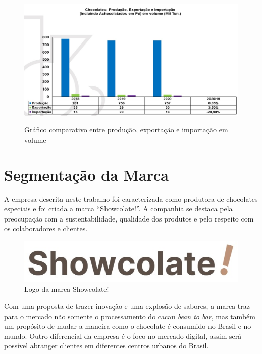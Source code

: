 \documentclass[
	12pt,				%
	openright,			%
	oneside,			%
	a4paper,			%
	english,			%
	french,				%
	spanish,			%
	brazil				%
	]{abntex2}
\begin{document}
\begin{figure}[H]
\begin{center}
\caption{Gráfico comparativo entre produção, exportação e importação em volume}
\includegraphics[scale=0.4]{../../Pictures/fig1.jpeg} 
\label{figmercado2}
\end{center}
\end{figure}

\newpage
\chapter{Segmentação da Marca}

A empresa descrita neste trabalho foi caracterizada como produtora de chocolates especiais e foi criada a marca “Showcolate!”. A companhia se destaca pela preocupação com a sustentabilidade, qualidade dos produtos e pelo respeito com os colaboradores e clientes.

\begin{figure}[H]
\begin{center}
\caption{Logo da marca Showcolate!}
\includegraphics[scale=0.5]{logoShow.jpeg} 
\end{center}
\end{figure}

Com uma proposta de trazer inovação e uma explosão de sabores, a marca traz para o mercado não somente o processamento do cacau \textit{bean to bar}, mas também um propósito de mudar a maneira como o chocolate é consumido no Brasil e no mundo. Outro diferencial da empresa é o foco no mercado digital, assim será possível abranger clientes em diferentes centros urbanos do Brasil. 
\end{document}

